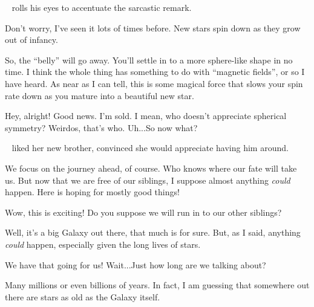 \documentclass[main.tex]{subfiles}
\begin{document}
\par \nar \rmlacedaemon~ rolls his eyes to accentuate the sarcastic remark.

\par \Celaeno Don't worry, I've seen it lots of times before.  New stars spin down as they grow out of infancy.

\par \Celaeno So, the ``belly'' will go away.  You'll settle in to a more sphere-like shape in no time.  I think the whole thing has something to do with ``magnetic fields'', or so I have heard.  As near as I can tell, this is some magical force that slows your spin rate down as you mature into a beautiful new star.

\par \Lacedaemon Hey, alright!  Good news.  I'm sold.  I mean, who doesn't appreciate spherical symmetry?  Weirdos, that's who.  Uh...So now what?

\par \nar \rmcelaeno~ liked her new brother, convinced she would appreciate having him around.

\par \Celaeno We focus on the journey ahead, of course.  Who knows where our fate will take us.  But now that we are free of our siblings, I suppose almost anything \textit{could} happen.  Here is hoping for mostly good things!

\par \Lacedaemon  Wow, this is exciting!  Do you suppose we will run in to our other siblings?

\par \Celaeno Well, it's a big Galaxy out there, that much is for sure.  But, as I said, anything \textit{could} happen, especially given the long lives of stars.  

\par \Lacedaemon We have that going for us!  Wait...Just how long are we talking about?

\par \Celaeno Many millions or even billions of years.  In fact, I am guessing that somewhere out there are stars as old as the Galaxy itself.
\end{document}

